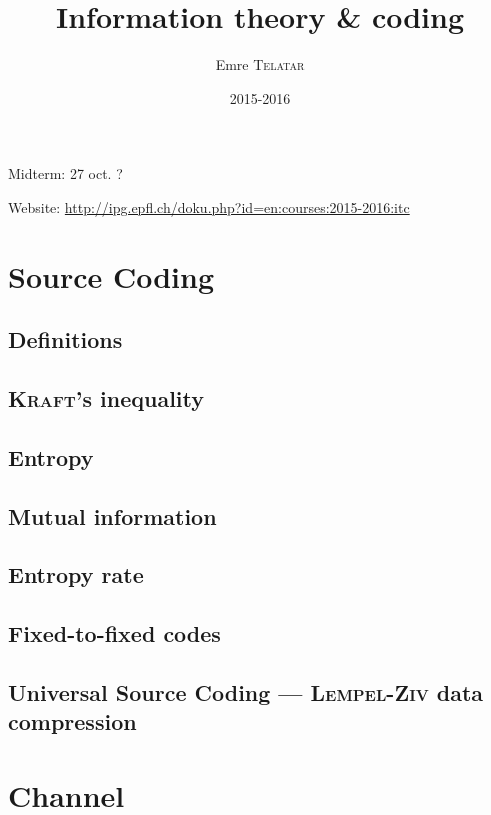 

\title{Information theory \& coding}
\author{Emre \textsc{Telatar}}
\date{2015-2016}


\maketitle
\tableofcontents

\newpage

Midterm: 27 oct. ?

Website: \url{http://ipg.epfl.ch/doku.php?id=en:courses:2015-2016:itc}

\chapter{Source Coding}
    \section{Definitions}
        
    \section{\textsc{Kraft}'s inequality}
        
    \section{Entropy}
        
    \section{Mutual information}
        
    \section{Entropy rate}
        
    \section{Fixed-to-fixed codes}
        
    \section[Universal Source Coding]{Universal Source Coding \---- \textsc{Lempel}-\textsc{Ziv} data compression}
        

\chapter{Channel}

